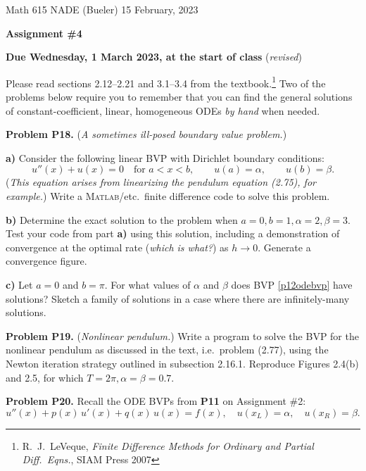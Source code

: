 \documentclass[12pt]{amsart}
\newcommand{\Matlab}{\textsc{Matlab}\xspace}
\newcommand{\prob}[1]{\bigskip\noindent\textbf{#1}\quad }
\newcommand{\epart}[1]{\medskip\noindent\textbf{#1)}\quad }
\begin{document}
\scriptsize \noindent Math 615 NADE (Bueler) \hfill 15 February, 2023
\normalsize

\medskip\bigskip

\Large\centerline{\textbf{Assignment \#4}}
\large
\bigskip

\centerline{\textbf{Due Wednesday, 1 March 2023, at the start of class} (\emph{revised})}
\bigskip
\normalsize

\thispagestyle{empty}

\bigskip
Please read sections 2.12--2.21 and 3.1--3.4 from the textbook.\footnote{R.~J.~LeVeque, \emph{Finite Difference Methods for Ordinary and Partial Diff.~Eqns.}, SIAM Press 2007}  Two of the problems below require you to remember that you can find the general solutions of constant-coefficient, linear, homogeneous ODEs \emph{by hand} when needed.

\medskip
\prob{Problem P18.}  (\emph{A sometimes ill-posed boundary value problem.}) 

\epart{a}  Consider the following linear BVP with Dirichlet boundary conditions:
\begin{equation}
u''(x) +  u(x) = 0 \quad \text{for $a< x< b$}, \qquad u(a)=\alpha, \qquad u(b)=\beta.  \label{p12odebvp}
\end{equation}
(\emph{This equation arises from linearizing the pendulum equation (2.75), for example.})  Write a \Matlab/etc.~finite difference code to solve this problem.

\epart{b}  Determine the exact solution to the problem when $a = 0, b = 1, \alpha = 2, \beta = 3$.  Test your code from part \textbf{a)} using this solution, including a demonstration of convergence at the optimal rate (\emph{which is what?}) as $h \to 0$.  Generate a convergence figure.

\epart{c}  Let $a=0$ and $b=\pi$.  For what values of $\alpha$ and $\beta$ does BVP \eqref{p12odebvp} have solutions?  Sketch a family of solutions in a case where there are infinitely-many solutions.


\prob{Problem P19.}  (\emph{Nonlinear pendulum.})   Write a program to solve the BVP for the nonlinear pendulum as discussed in the text, i.e.~problem (2.77), using the Newton iteration strategy outlined in subsection 2.16.1.  Reproduce Figures 2.4(b) and 2.5, for which $T=2\pi,\alpha=\beta=0.7$.


\prob{Problem P20.}  Recall the ODE BVPs from \textbf{P11} on Assignment \#2:
\begin{equation*}
u''(x) + p(x)\, u'(x) + q(x)\, u(x) = f(x), \quad u(x_L) = \alpha, \quad u(x_R) = \beta.
\end{equation*}
\end{document}
